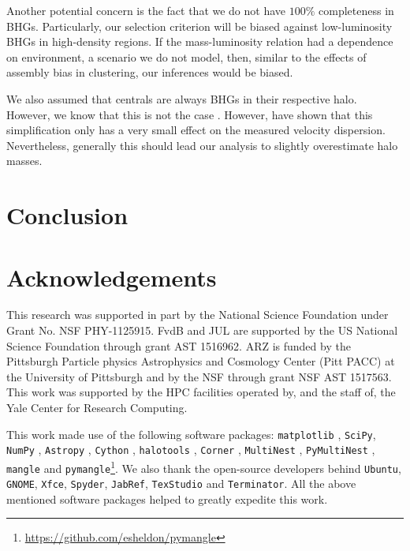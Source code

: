 \documentclass[fleqn,usenatbib,useAMS]{mnras}
\begin{document}
Another potential concern is the fact that we do not have $100\%$ completeness in BHGs. Particularly, our selection criterion will be biased against low-luminosity BHGs in high-density regions. If the mass-luminosity relation had a dependence on environment, a scenario we do not model, then, similar to the effects of assembly bias in clustering, our inferences would be biased.

We also assumed that centrals are always BHGs in their respective halo. However, we know that this is not the case \citep{Skibba+11, Hikage+13, Wang+14, Hoshino+15, Lange+18a}. However, \cite{Lange+18a} have shown that this simplification only has a very small effect on the measured velocity dispersion. Nevertheless, generally this should lead our analysis to slightly overestimate halo masses.

\section{Conclusion}

\section*{Acknowledgements}

This research was supported in part by the National Science Foundation under Grant No. NSF PHY-1125915. FvdB and JUL are supported by the US National Science Foundation through grant AST 1516962. ARZ is funded by the Pittsburgh Particle physics Astrophysics and Cosmology Center (Pitt PACC) at the University of Pittsburgh and by the NSF through grant NSF AST 1517563. This work was supported by the HPC facilities operated by, and the staff of, the Yale Center for Research Computing.

This work made use of the following software packages: \texttt{matplotlib} \citep{Hunter07}, \texttt{SciPy}, \texttt{NumPy} \citep{vdWalt+11}, \texttt{Astropy} \citep{Astropy13}, \texttt{Cython} \citep{Behnel+11}, \texttt{halotools} \citep{Hearin+16}, \texttt{Corner} \citep{Foreman-Mackey+16}, \texttt{MultiNest} \citep{Feroz+08,Feroz+09, Feroz+13}, \texttt{PyMultiNest} \citep{Buchner+14}, \texttt{mangle} \citep{Hamilton+04, Swanson+08} and \texttt{pymangle}\footnote{\url{https://github.com/esheldon/pymangle}}. We also thank the open-source developers behind \texttt{Ubuntu}, \texttt{GNOME}, \texttt{Xfce}, \texttt{Spyder}, \texttt{JabRef}, \texttt{TexStudio} and \texttt{Terminator}. All the above mentioned software packages helped to greatly expedite this work.
\end{document}
